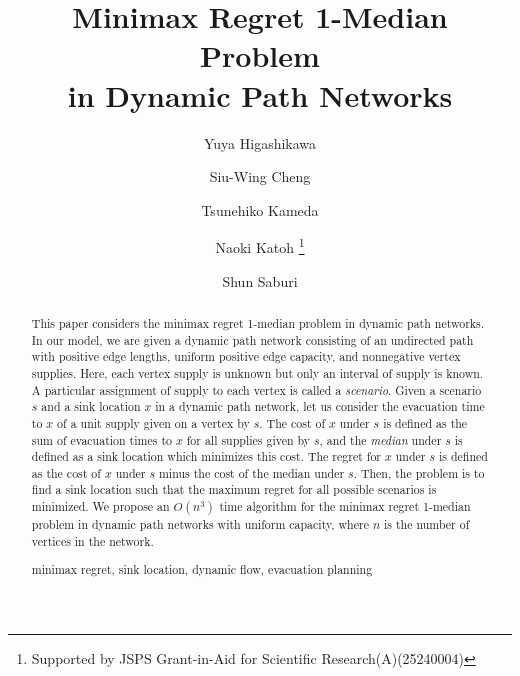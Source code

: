 \documentclass[a4paper]{llncs}
\newcommand{\keywords}[1]{\par\addvspace\baselineskip
\noindent\keywordname\enspace\ignorespaces#1}
\begin{document}

\mainmatter

\title{Minimax Regret 1-Median Problem \\ in Dynamic Path Networks}

\author{
Yuya Higashikawa 
\and Siu-Wing Cheng 
\and Tsunehiko Kameda 
\and Naoki Katoh \thanks{Supported by JSPS Grant-in-Aid for Scientific Research(A)(25240004)}
\and Shun Saburi 
}



\maketitle


\begin{abstract}
This paper considers the minimax regret 1-median problem in dynamic path networks.
In our model, we are given a dynamic path network consisting of an undirected path with positive edge lengths, uniform positive edge capacity,
and nonnegative vertex supplies.
Here, each vertex supply is unknown but only an interval of supply is known.
A particular assignment of supply to each vertex is called a {\it scenario}. 
Given a scenario $s$ and 
a sink location
$x$ in a dynamic path network,
let us consider the evacuation time to $x$ of a unit supply
given on a vertex by $s$. 
The cost of $x$ under $s$ is defined as the sum of evacuation times to $x$ for all supplies given by $s$, 
and the {\it median} under $s$ is defined as a sink location which minimizes this cost.
The regret for $x$ under $s$ is defined as the cost of $x$ under $s$ minus the cost of the median under $s$. 
Then, the problem is to find a sink location such that the maximum regret for all possible scenarios is minimized.
We propose an $O(n^3)$ time algorithm for the minimax regret 1-median problem in dynamic path networks with uniform capacity, 
where $n$ is the number of vertices in the network. 
\keywords{minimax regret, sink location, dynamic flow, evacuation planning}
\end{abstract}
\end{document}

